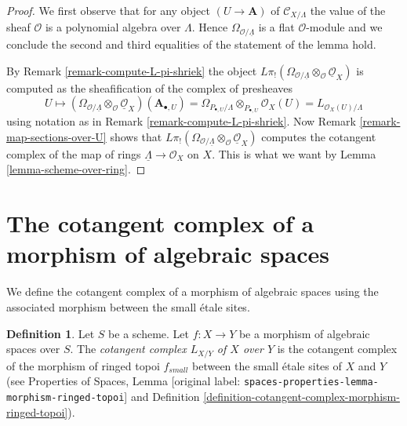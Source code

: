 \documentclass[10pt,a4paper]{article}
\theoremstyle{plain}
\theoremstyle{definition}
\newtheorem{definition}[subsection]{Definition}
\theoremstyle{remark}
\numberwithin{equation}{subsection}
\begin{document}
\begin{proof}
We first observe that for any object $(U \to \mathbf{A})$ of
$\mathcal{C}_{X/\Lambda}$
the value of the sheaf $\mathcal{O}$ is a polynomial algebra over $\Lambda$.
Hence $\Omega_{\mathcal{O}/\underline{\Lambda}}$ is a flat $\mathcal{O}$-module
and we conclude the second and third equalities of the statement of the
lemma hold.

\medskip\noindent
By Remark \ref{remark-compute-L-pi-shriek} the object
$L\pi_!(\Omega_{\mathcal{O}/\underline{\Lambda}}
\otimes_\mathcal{O} \underline{\mathcal{O}}_X)$
is computed as the sheafification of the complex of presheaves
$$
U \mapsto
\left(\Omega_{\mathcal{O}/\underline{\Lambda}}
\otimes_\mathcal{O} \underline{\mathcal{O}}_X\right)(\mathbf{A}_{\bullet, U})
=
\Omega_{P_{\bullet, U}/\Lambda} \otimes_{P_{\bullet, U}} \mathcal{O}_X(U) =
L_{\mathcal{O}_X(U)/\Lambda}
$$
using notation as in Remark \ref{remark-compute-L-pi-shriek}.
Now Remark \ref{remark-map-sections-over-U} shows that
$L\pi_!(\Omega_{\mathcal{O}/\underline{\Lambda}}
\otimes_\mathcal{O} \underline{\mathcal{O}}_X)$
computes the cotangent complex of the map of rings
$\underline{\Lambda} \to \mathcal{O}_X$ on $X$.
This is what we want by Lemma \ref{lemma-scheme-over-ring}.
\end{proof}








\section{The cotangent complex of a morphism of algebraic spaces}
\label{section-cotangent-morphism-spaces}

\noindent
We define the cotangent complex of a morphism of algebraic spaces
using the associated morphism between the small \'etale sites.

\begin{definition}
\label{definition-cotangent-morphism-spaces}
Let $S$ be a scheme. Let $f : X \to Y$ be a morphism of algebraic spaces
over $S$. The {\it cotangent complex $L_{X/Y}$ of $X$ over $Y$} is the
cotangent complex of the morphism of ringed topoi $f_{small}$
between the small \'etale sites of $X$ and $Y$
(see
Properties of Spaces, Lemma
\textnormal{[original label: \nolinkurl{spaces-properties-lemma-morphism-ringed-topoi}]}
and
Definition \ref{definition-cotangent-complex-morphism-ringed-topoi}).
\end{definition}
\end{document}

